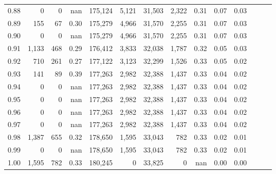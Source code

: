 \begin{tabular}{rrrrrrrrrrrrrr}
0.88 &       0 &      0 &   nan &  175,124 &    5,121 &  31,503 &   2,322 &  0.31 &  0.07 &      0.03 \\
0.89 &     155 &     67 &  0.30 &  175,279 &    4,966 &  31,570 &   2,255 &  0.31 &  0.07 &      0.03 \\
0.90 &       0 &      0 &   nan &  175,279 &    4,966 &  31,570 &   2,255 &  0.31 &  0.07 &      0.03 \\
0.91 &   1,133 &    468 &  0.29 &  176,412 &    3,833 &  32,038 &   1,787 &  0.32 &  0.05 &      0.03 \\
0.92 &     710 &    261 &  0.27 &  177,122 &    3,123 &  32,299 &   1,526 &  0.33 &  0.05 &      0.02 \\
0.93 &     141 &     89 &  0.39 &  177,263 &    2,982 &  32,388 &   1,437 &  0.33 &  0.04 &      0.02 \\
0.94 &       0 &      0 &   nan &  177,263 &    2,982 &  32,388 &   1,437 &  0.33 &  0.04 &      0.02 \\
0.95 &       0 &      0 &   nan &  177,263 &    2,982 &  32,388 &   1,437 &  0.33 &  0.04 &      0.02 \\
0.96 &       0 &      0 &   nan &  177,263 &    2,982 &  32,388 &   1,437 &  0.33 &  0.04 &      0.02 \\
0.97 &       0 &      0 &   nan &  177,263 &    2,982 &  32,388 &   1,437 &  0.33 &  0.04 &      0.02 \\
0.98 &   1,387 &    655 &  0.32 &  178,650 &    1,595 &  33,043 &     782 &  0.33 &  0.02 &      0.01 \\
0.99 &       0 &      0 &   nan &  178,650 &    1,595 &  33,043 &     782 &  0.33 &  0.02 &      0.01 \\
1.00 &   1,595 &    782 &  0.33 &  180,245 &        0 &  33,825 &       0 &   nan &  0.00 &      0.00 \\
\bottomrule
\end{tabular}
